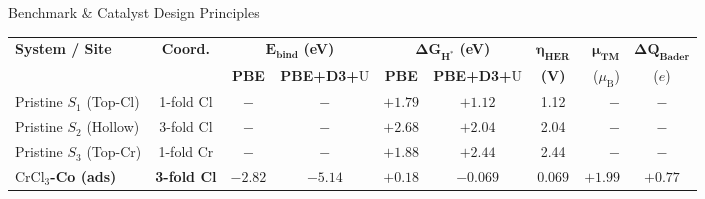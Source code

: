 \documentclass[aspectratio=169]{beamer}
\begin{document}
\begin{frame}{Benchmark \& Catalyst Design Principles}
  \begin{table}[htbp]
    \centering
    \tiny
    \begin{tabular}{lccccccrc}
      \toprule
      \textbf{System / Site}            & \textbf{Coord.}    & \multicolumn{2}{c}{$\boldsymbol{E_{\text{bind}}}$ \textbf{(eV)}} & \multicolumn{2}{c}{$\boldsymbol{\Delta G_{\text{H}^*}}$ \textbf{(eV)}} & $\boldsymbol{\eta_{\text{HER}}}$ & $\boldsymbol{\mu_{\text{TM}}}$ & $\boldsymbol{\Delta Q_{\text{Bader}}}$                                \\
      \cmidrule(lr){3-4} \cmidrule(lr){5-6}
      &                    & \textbf{PBE}                                                     & \textbf{PBE+D3+}U                                                      & \textbf{PBE}                     & \textbf{PBE+D3+}U              & \textbf{(V)}                           & ($\mu_{\text{B}}$) & ($e$)   \\
      \midrule
      Pristine $S_1$ (Top-Cl)           & 1-fold Cl          & $-$                                                              & $-$                                                                    & $+1.79$                          & $+1.12$                        & 1.12                                   & $-$                & $-$     \\
      Pristine $S_2$ (Hollow)           & 3-fold Cl          & $-$                                                              & $-$                                                                    & $+2.68$                          & $+2.04$                        & 2.04                                   & $-$                & $-$     \\
      Pristine $S_3$ (Top-Cr)           & 1-fold Cr          & $-$                                                              & $-$                                                                    & $+1.88$                          & $+2.44$                        & 2.44                                   & $-$                & $-$     \\
      \midrule
      \textbf{$\text{CrCl}_3$-Co (ads)} & \textbf{3-fold Cl} & $-2.82$                                                          & $-5.14$                                                                & $+0.18$                          & $\mathbf{-0.069}$              & $\mathbf{0.069}$                       & $+1.99$            & $+0.77$ \\

\end{tabular}
\end{table}
\end{frame}
\end{document}
